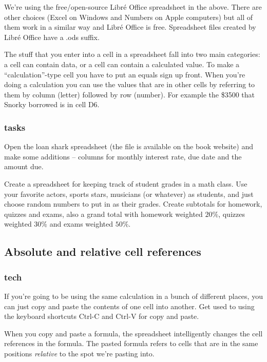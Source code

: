 We're using the free/open-source Libr\'{e} Office spreadsheet in the above.  There are other choices (Excel on Windows and Numbers on Apple computers) but all of them work in a similar way and Libr\'{e} Office is free.  Spreadsheet files created by 
Libr\'{e} Office have a .ods suffix.  

The stuff that you enter into a cell in a spreadsheet fall into two main categories: a cell can contain data, or a cell can contain a calculated value.  To make a ``calculation''-type cell you have to put an equals sign up front.  When you're doing a calculation you can use the values that are in other cells by referring to them by column (letter) followed by row (number).  For example the \$3500 that Snorky borrowed is in cell D6.

\subsubsection{tasks}

Open the loan shark spreadsheet (the file is available on the book website) and make some additions -- columns for monthly interest rate, due date and the amount due.

Create a spreadsheet for keeping track of student grades in a math class. Use your favorite actors, sports stars, musicians (or whatever) as students, and just choose random numbers to put in as their grades. Create subtotals for homework, quizzes and exams, also a grand total with homework weighted $20\%$, quizzes weighted
$30\%$ and exams weighted $50\%$.



\subsection{Absolute and relative cell references}

\subsubsection{tech}

If you're going to be using the same calculation in a bunch of different places, you can just copy and paste the contents of one cell into another.  Get used to using the keyboard shortcuts Ctrl-C and Ctrl-V for copy and paste.  

When you copy and paste a formula, the spreadsheet intelligently changes the cell references in the formula.  The pasted formula refers to cells that are in the same positions {\em relative} to the spot we're pasting into.  

